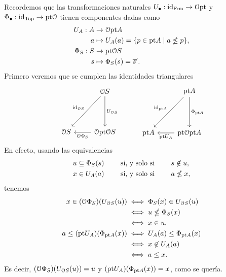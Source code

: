 Recordemos que las transformaciones naturales
$U_\bullet:\id_\Frm\to\cal O\pt$ y
$\Phi_\bullet:\id_\Top\to\pt\cal O$
tienen componentes dadas como
\begin{align*}
    U_A:A&\to \cal O\pt A \\
    a &\mapsto U_A(a) = \{p\in \pt A \mid a\nleq p\}, \\
    \Phi_S:S&\to \pt\cal O S \\
    s &\mapsto \Phi_S(s)=\ol{s}'.
\end{align*}
Primero veremos que se cumplen las identidades triangulares
\[
    \begin{tikzcd}[row sep=15mm]
        & \cal OS \ar[d,"U_{\cal OS}"] \ar[dl,"\id_{\cal OS}"']
        \\
        \cal OS
        & \cal O\pt\cal OS \ar[l,"\cal O\Phi_S"]
    \end{tikzcd}
    \hspace{10mm}
    \begin{tikzcd}[row sep=15mm]
        & \pt A \ar[d,"\Phi_{\pt A}"] \ar[dl,"\id_{\pt A}"']
        \\
        \pt A
        & \pt \cal O\pt A \ar[l,"\pt U_A"]
    \end{tikzcd}
\]
En efecto, usando las equivalencias
\begin{align*}
    u\subseteq \Phi_S(s) &\ssi s\nin u, \\
    x\in U_A(a) &\ssi a\nleq x,
\end{align*}
tenemos
\begin{align*}
    x\in (\cal O\Phi_S)(U_{\cal OS}(u))
    &\iff \Phi_S(x) \in U_{\cal OS}(u) \\
    &\iff u\nleq \Phi_S(x) \\
    &\iff x\in u,
    \\
    a\leq (\pt U_A)(\Phi_{\pt A}(x))
    &\iff U_A(a) \leq \Phi_{\pt A}(x) \\
    &\iff x\nin U_A(a) \\
    &\iff a\leq x.
\end{align*}
Es decir, $(\cal O\Phi_S)(U_{\cal OS}(u))=u$
y $(\pt U_A)(\Phi_{\pt A}(x))=x$, como se quería.

